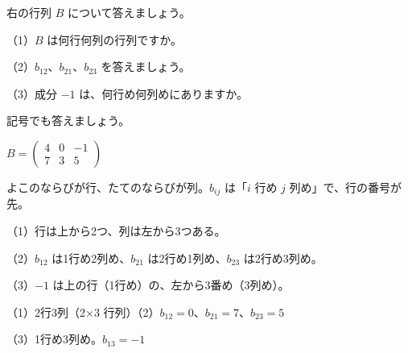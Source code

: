 \begin{kotoba}
\small
{}
\end{kotoba}

{}


\begin{reidai}[成分を読む]
\noindent\begin{minipage}[c]{0.64\linewidth}\raggedright
右の行列 $B$ について答えましょう。\par
（1）$B$ は何行何列の行列ですか。\par
（2）$b_{12}$、$b_{21}$、$b_{23}$ を答えましょう。\par
（3）成分 $-1$ は、何行め何列めにありますか。\par
\phantom{（3）}記号でも答えましょう。
\end{minipage}\hfill
\begin{minipage}[c]{0.34\linewidth}\centering
$B=\begin{pmatrix} 4 & 0 & -1\\ 7 & 3 & 5 \end{pmatrix}$
\end{minipage}\par
\kangaekata よこのならびが行、たてのならびが列。$b_{ij}$ は「$i$ 行め $j$ 列め」で、行の番号が先。\par
\shiki\kviibs{}\zw{} （1）行は上から2つ、列は左から3つある。\par
\kviiba（2）$b_{12}$ は1行め2列め、$b_{21}$ は2行め1列め、$b_{23}$ は2行め3列め。\par
\kviiba（3）$-1$ は上の行（1行め）の、左から3番め（3列め）。\par
\kotae\kviibs{}\zw{} （1）2行3列（2×3 行列）\quad （2）$b_{12}=0$、$b_{21}=7$、$b_{23}=5$\par
\kviiba（3）1行め3列め。$b_{13}=-1$
\end{reidai}

